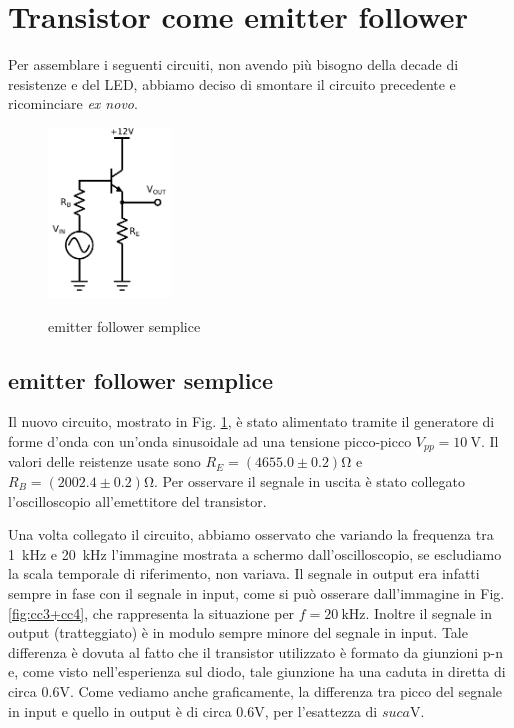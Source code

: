 \section{Transistor come emitter follower}

Per assemblare i seguenti circuiti, non avendo più bisogno della decade di resistenze e del LED, abbiamo deciso di smontare il circuito precedente e ricominciare \emph{ex novo}.

\begin{figure}
	\caption{emitter follower semplice}
	\includegraphics[height=45mm]{cc3.pdf}
	\label{fig:cc3}
\end{figure}

\subsection{emitter follower semplice}
Il nuovo circuito, mostrato in Fig. \ref{fig:cc3}, è stato alimentato tramite il generatore di forme d'onda con un'onda sinusoidale ad una tensione picco-picco $V_{pp} = \SI{10}{\volt}$.
Il valori delle reistenze usate sono $R_E = (4655.0 \pm 0.2)\si{\ohm}$ e $R_B = (2002.4 \pm 0.2)\si{\ohm}$.
Per osservare il segnale in uscita è stato collegato l'oscilloscopio all'emettitore del transistor.

Una volta collegato il circuito, abbiamo osservato che variando la frequenza tra \SI{1}{\kilo\hertz} e \SI{20}{\kilo\hertz} l'immagine mostrata a schermo dall'oscilloscopio, se escludiamo la scala temporale di riferimento, non variava.
Il segnale in output era infatti sempre in fase con il segnale in input, come si può osserare dall'immagine in Fig. \ref{fig:cc3+cc4}, che rappresenta la situazione per $f = \SI{20}{\kilo\hertz}$.
Inoltre il segnale in output (tratteggiato) è in modulo sempre minore del segnale in input.
Tale differenza è dovuta al fatto che il transistor utilizzato è formato da giunzioni p-n e, come visto nell'esperienza sul diodo, tale giunzione ha una caduta in diretta di circa $0.6\si{\volt}$. Come vediamo anche graficamente, la differenza tra picco del segnale in input e quello in output è di circa $0.6\si{\volt}$, per l'esattezza di $suca\si{\volt}$.

